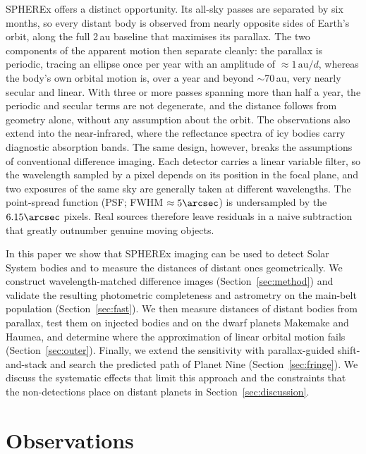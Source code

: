 \documentclass[twocolumn,linenumbers,anonymous]{aastex702}
\begin{document}
SPHEREx \citep{dore14,korngut18,crill20,bock26} offers a distinct opportunity. Its all-sky passes are separated by six months, so every distant body is observed from nearly opposite sides of Earth's orbit, along the full 2\,au baseline that maximises its parallax. The two components of the apparent motion then separate cleanly: the parallax is periodic, tracing an ellipse once per year with an amplitude of $\approx 1\,\mathrm{au}/d$, whereas the body's own orbital motion is, over a year and beyond $\sim$70\,au, very nearly secular and linear. With three or more passes spanning more than half a year, the periodic and secular terms are not degenerate, and the distance follows from geometry alone, without any assumption about the orbit. The observations also extend into the near-infrared, where the reflectance spectra of icy bodies carry diagnostic absorption bands. The same design, however, breaks the assumptions of conventional difference imaging. Each detector carries a linear variable filter, so the wavelength sampled by a pixel depends on its position in the focal plane, and two exposures of the same sky are generally taken at different wavelengths. The point-spread function (PSF; FWHM $\approx 5\arcsec$) is undersampled by the $6.15\arcsec$ pixels. Real sources therefore leave residuals in a naive subtraction that greatly outnumber genuine moving objects.

In this paper we show that SPHEREx imaging can be used to detect Solar System bodies and to measure the distances of distant ones geometrically. We construct wavelength-matched difference images (Section~\ref{sec:method}) and validate the resulting photometric completeness and astrometry on the main-belt population (Section~\ref{sec:fast}). We then measure distances of distant bodies from parallax, test them on injected bodies and on the dwarf planets Makemake and Haumea, and determine where the approximation of linear orbital motion fails (Section~\ref{sec:outer}). Finally, we extend the sensitivity with parallax-guided shift-and-stack and search the predicted path of Planet Nine (Section~\ref{sec:fringe}). We discuss the systematic effects that limit this approach and the constraints that the non-detections place on distant planets in Section~\ref{sec:discussion}.

\section{Observations}\label{sec:data}
\end{document}
